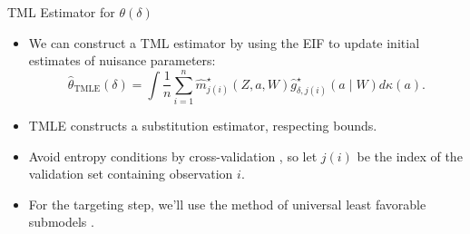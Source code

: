 \documentclass{beamer}
\begin{document}
\begin{frame}[c]{TML Estimator for $\theta(\delta)$}

\begin{center}
\begin{itemize}
\itemsep2pt
\item We can construct a TML estimator by using the EIF to update initial
  estimates of nuisance parameters:
    \begin{equation*}
      \hat{\theta}_{\text{TMLE}}(\delta) = \int \frac{1}{n} \sum_{i=1}^n
      \hat{m}^{\star}_{j(i)}(Z, a, W)
      \hat{g}_{\delta, j(i)}^{\star}(a \mid W) d\kappa(a).
    \end{equation*}
  \item TMLE constructs a substitution estimator, respecting bounds.
  \item Avoid entropy conditions by cross-validation \citep{zheng2011cross,
    chernozhukov2016double}, so let $j(i)$ be the index of the validation set
    containing observation $i$.
  \item For the targeting step, we'll use the method of universal least
    favorable submodels \citep{vdl2016one}.
\end{itemize}
\end{center}

\note{
}

\end{frame}


\end{document}
